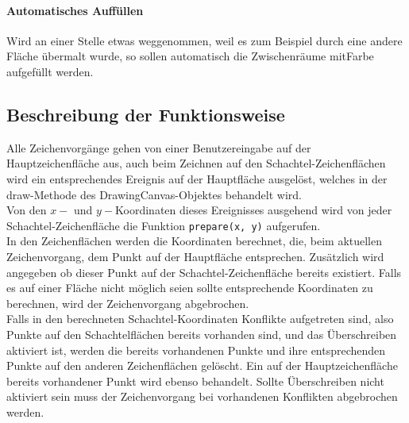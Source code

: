 \paragraph{Automatisches Auffüllen}
Wird an einer Stelle etwas weggenommen, weil es zum Beispiel durch eine andere Fläche übermalt wurde, so sollen automatisch die Zwischenräume mitFarbe aufgefüllt werden.

\subsection{Beschreibung der Funktionsweise}
\label{subsec:funktionsweise}

Alle Zeichenvorgänge gehen von einer Benutzereingabe auf der Hauptzeichenfläche aus, auch beim Zeichnen auf den Schachtel-Zeichenflächen wird ein entsprechendes Ereignis auf der Hauptfläche ausgelöst, welches in der draw-Methode des DrawingCanvas-Objektes behandelt wird.\\

Von den $x - $ und $y - $Koordinaten dieses Ereignisses ausgehend wird von jeder Schachtel-Zeichenfläche die Funktion \texttt{prepare(x, y)} aufgerufen.\\

In den Zeichenflächen werden die Koordinaten berechnet, die, beim aktuellen Zeichenvorgang, dem Punkt auf der Hauptfläche entsprechen. Zusätzlich wird angegeben ob dieser Punkt auf der Schachtel-Zeichenfläche bereits existiert. Falls es auf einer Fläche nicht möglich seien sollte entsprechende Koordinaten zu berechnen, wird der Zeichenvorgang abgebrochen.\\

Falls in den berechneten Schachtel-Koordinaten Konflikte aufgetreten sind, also Punkte auf den Schachtelflächen bereits vorhanden sind, und das Überschreiben aktiviert ist, werden die bereits vorhandenen Punkte und ihre entsprechenden Punkte auf den anderen Zeichenflächen gelöscht. Ein auf der Hauptzeichenfläche bereits vorhandener Punkt wird ebenso behandelt. Sollte Überschreiben nicht aktiviert sein muss der Zeichenvorgang bei vorhandenen Konflikten abgebrochen werden.\\

